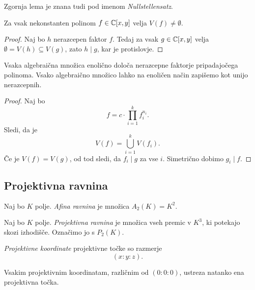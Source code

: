 \begin{opomba}
Zgornja lema je znana tudi pod imenom \emph{Nullstellensatz}.
\end{opomba}

\begin{posledica}
Za vsak nekonstanten polinom $f \in \mathbb{C}[x,y]$ velja
$V(f) \ne \emptyset$.
\end{posledica}

\begin{proof}
Naj bo $h$ nerazcepen faktor $f$. Tedaj za vsak $g \in \mathbb{C}[x,y]$
velja $\emptyset = V(h) \subseteq V(g)$, zato $h \mid g$, kar je
protislovje.
\end{proof}

\begin{posledica}
Vsaka algebraična množica enolično določa nerazcepne faktorje
pripadajočega polinoma. Vsako algebraično množico lahko na enoličen
način zapišemo kot unijo nerazcepnih.
\end{posledica}

\begin{proof}
Naj bo
\[
f = c \cdot \prod_{i=1}^k f_i^{n_i}.
\]
Sledi, da je
\[
V(f) = \bigcup_{i=1}^k V(f_i).
\]
Če je $V(f) = V(g)$, od tod sledi, da $f_i \mid g$ za vse $i$.
Simetrično dobimo $g_i \mid f$.
\end{proof}

\newpage

\subsection{Projektivna ravnina}


\begin{definicija}
Naj bo $K$ polje. \emph{Afina ravnina} je
množica $A_2(K) = K^2$.
\end{definicija}

\begin{definicija}
Naj bo $K$ polje.
\emph{Projektivna ravnina} je množica
vseh premic v $K^3$, ki potekajo skozi izhodišče. Označimo jo s
$P_2(K)$.
\end{definicija}

\begin{definicija}
\emph{Projektivne koordinate}
projektivne točke so razmerje
\[
(x : y : z).
\]
\end{definicija}

\begin{opomba}
Vsakim projektivnim koordinatam, različnim od $(0 : 0 : 0)$,
ustreza natanko ena projektivna točka.
\end{opomba}

